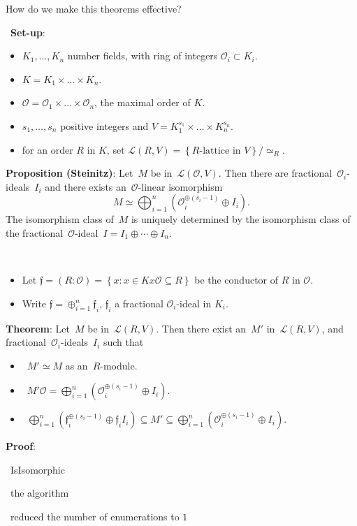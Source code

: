 \documentclass[usenames,dvipsnames]{beamer}
\newcommand{\cO}{{\mathcal O}}
\newcommand{\cL}{{\mathcal L}}
\newcommand{\frf}{{\mathfrak f}}
\newcommand{\set}[1]{\left\lbrace#1\right\rbrace }
\begin{document}
\begin{frame}
   How do we make this theorems effective?
\end{frame}

\begin{frame}{}\
   {\bf Set-up}:
   \begin{itemize}
      \item $K_1,\ldots,K_n$ number fields, with ring of integers $\cO_i\subset K_i$.
      \item $K=K_1\times \ldots \times K_n$.
      \item $\cO=\cO_1\times \ldots \times \cO_n$, the maximal order of $K$.
      \item $s_1,\ldots,s_n$ positive integers and $V = K_1^{s_1}\times \ldots\times K_n^{s_n}$.
      \item for an order $R$ in $K$, set $\cL(R,V) = \set{\text{$R$-lattice in $V$}}/\simeq_R$.
   \end{itemize}
   {\bf Proposition (Steinitz)}:
   Let~$M$ be in~$\cL(\cO,V)$.
   Then there are fractional~$\cO_i$-ideals~$I_i$ and there exists an~$\cO$-linear isomorphism
   \[ M\simeq
   \bigoplus_{i=1}^n \left(\cO_i^{\oplus(s_i-1)}\oplus I_i\right).
   \]
   The isomorphism class of~$M$ is uniquely determined by 
   the isomorphism class of the fractional~$\cO$-ideal~$I=I_1\oplus \cdots \oplus I_n$.
\end{frame}

\begin{frame}{}\
   \begin{itemize}
      \item Let $\frf=(R:\cO)=\set{x : x \in K x\cO \subseteq R}$ be the conductor of $R$ in $\cO$.
      \item Write $\frf=\oplus_{i=1}^n\frf_i$, $\frf_i$ a fractional $\cO_i$-ideal in $K_i$.
   \end{itemize}
   {\bf Theorem}:
   Let~$M$ be in~$\cL(R,V)$.
   Then there exist an~$M'$ in~$\cL(R,V)$, and fractional~$\cO_i$-ideals~$I_i$ such that
   \begin{itemize}
      \item~$M'\simeq M$ as an~$R$-module.
      \item~$M'\cO = \bigoplus_{i=1}^n \left(\cO_i^{\oplus(s_i-1)}\oplus I_i\right)$.
      \item~$\bigoplus_{i=1}^n \left(\frf_i^{\oplus(s_i-1)}\oplus \frf_iI_i\right) \subseteq M' \subseteq
      \bigoplus_{i=1}^n \left(\cO_i^{\oplus(s_i-1)}\oplus I_i\right)$.
   \end{itemize}
   {\bf Proof}:
\end{frame}

\begin{frame}{}\
   IsIsomorphic
\end{frame}

\begin{frame}{}\
   the algorithm
\end{frame}


\begin{frame}{}\
   reduced the number of enumerations to $1$
\end{frame}

\end{document}
